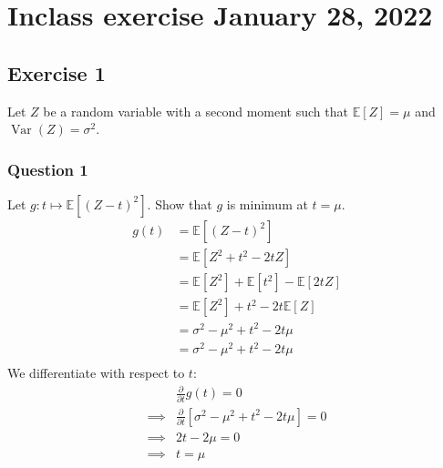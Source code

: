 \documentclass{article}
\newcommand{\E}{\mathbb{E}}
\newcommand{\var}{\operatorname{Var}}
\begin{document}
\section{Inclass exercise January 28, 2022}
\subsection{Exercise 1}
Let \(Z\) be a random variable with a second moment such that \(\E[Z] = \mu\) and \(\var(Z) = \sigma^2\).
\subsubsection{Question 1}
Let \(g : t \mapsto \E[(Z-t)^2]\). Show that \(g\) is minimum at \(t = \mu\).
\begin{align*}
  g(t)
   & =
  \E\left[ (Z-t)^2 \right]                                       \\
   & =
  \E\left[ Z^2 + t^2 - 2tZ \right]                               \\
   & =
  \E\left[ Z^2\right] + \E\left[t^2\right] - \E\left[2tZ \right] \\
   & =
  \E\left[ Z^2\right] + t^2 - 2t\E\left[Z \right]                \\
   & =
  \sigma^2 - \mu^2 + t^2 - 2t\mu                                 \\
   & =
  \sigma^2 - \mu^2 + t^2 - 2t\mu                                 \\
\end{align*}
We differentiate with respect to \(t\):
\begin{align*}
           & \frac{\partial}{\partial t} g(t) = 0                             \\
  \implies &
  \frac{\partial}{\partial t} \left[\sigma^2 - \mu^2 + t^2 - 2t\mu\right] = 0 \\
  \implies &
  2t - 2\mu  = 0                                                              \\
  \implies &
  t = \mu                                                                     \\
\end{align*}
\end{document}
